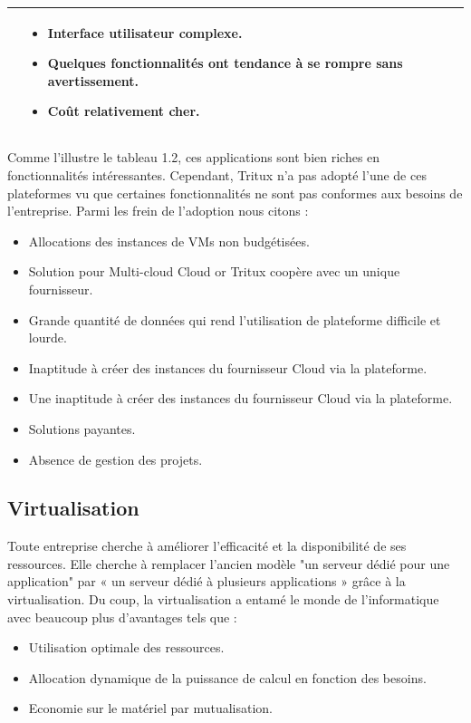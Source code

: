 \begin{table}[H]
\begin{tabular}{|p{2.8cm}|p{6.2cm}|p{5.7cm}|}
\begin{itemize}
		\end{itemize}         
		& \begin{itemize}
			\item Interface utilisateur complexe.
			\item Quelques fonctionnalités ont tendance à se rompre sans avertissement.
			\item Coût relativement cher.
		\end{itemize}\\    
		\hline
	\end{tabular}
\end{table}
Comme  l'illustre  le  tableau  1.2,  ces  applications  sont  bien  riches  en  fonctionnalités 
intéressantes.  Cependant,  Tritux  n'a  pas  adopté  l'une  de  ces  plateformes   vu  que 
certaines  fonctionnalités  ne  sont  pas  conformes  aux  besoins  de  l'entreprise. Parmi les frein de l'adoption nous citons :  

\begin{itemize}
	\item  Allocations des instances  de  VMs  non  budgétisées. 
	\item  Solution pour  Multi-cloud  Cloud  or  Tritux  coopère  avec un unique  fournisseur.
	\item  Grande  quantité  de  données  qui  rend  l'utilisation  de  plateforme  difficile et lourde. 
	\item  Inaptitude  à  créer  des  instances  du  fournisseur  Cloud  via  la  plateforme. 
	\item Une inaptitude à créer des instances du fournisseur Cloud via la plateforme.
	\item Solutions payantes.
	\item Absence de gestion des projets.
\end{itemize}


\subsection{Virtualisation}

Toute entreprise cherche à améliorer l'efficacité et la disponibilité de ses ressources.  Elle cherche à remplacer  
l'ancien  modèle  "un  serveur dédié pour une  application" par  « un serveur dédié à plusieurs applications »  grâce à la  virtualisation.
Du coup, la virtualisation a  entamé  le  monde 
de  l'informatique  avec  beaucoup  plus  d'avantages  tels  que  : 
\begin{itemize}
	\item Utilisation optimale des ressources.
	\item Allocation dynamique de la puissance de calcul en fonction des besoins.
	\item Economie sur le matériel par mutualisation.
\end{itemize}



